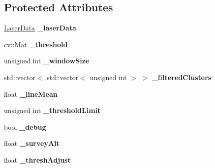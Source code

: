 \subsection*{Protected Attributes}
\begin{DoxyCompactItemize}
\item 
\hyperlink{classLaserData}{Laser\+Data} {\bfseries \+\_\+laser\+Data}\hypertarget{classLaserLoadImage_a20ccad5730f328187aa2ea6ebbd4593a}{}\label{classLaserLoadImage_a20ccad5730f328187aa2ea6ebbd4593a}

\item 
cv\+::\+Mat {\bfseries \+\_\+threshold}\hypertarget{classLaserLoadImage_aeb5996250313d036392ff988d1e84d8d}{}\label{classLaserLoadImage_aeb5996250313d036392ff988d1e84d8d}

\item 
unsigned int {\bfseries \+\_\+window\+Size}\hypertarget{classLaserLoadImage_ac0e8f5931a32a78468afcf1a15425d44}{}\label{classLaserLoadImage_ac0e8f5931a32a78468afcf1a15425d44}

\item 
std\+::vector$<$ std\+::vector$<$ unsigned int $>$ $>$ {\bfseries \+\_\+filtered\+Clusters}\hypertarget{classLaserLoadImage_af3fca1d9756d7cf5d304d5b813ff1b45}{}\label{classLaserLoadImage_af3fca1d9756d7cf5d304d5b813ff1b45}

\item 
float {\bfseries \+\_\+line\+Mean}\hypertarget{classLaserLoadImage_a90ff3111ee60ba50a9dcaf90b9a2734a}{}\label{classLaserLoadImage_a90ff3111ee60ba50a9dcaf90b9a2734a}

\item 
unsigned int {\bfseries \+\_\+threshold\+Limit}\hypertarget{classLaserLoadImage_a1d24ebe33a3d2ea1b9f2aa9c7e42caf4}{}\label{classLaserLoadImage_a1d24ebe33a3d2ea1b9f2aa9c7e42caf4}

\item 
bool {\bfseries \+\_\+debug}\hypertarget{classLaserLoadImage_a2c9ccd7fba113ebb52c6e5824d05daeb}{}\label{classLaserLoadImage_a2c9ccd7fba113ebb52c6e5824d05daeb}

\item 
float {\bfseries \+\_\+survey\+Alt}\hypertarget{classLaserLoadImage_a33091b991b7a53293f9d4a766583cdc7}{}\label{classLaserLoadImage_a33091b991b7a53293f9d4a766583cdc7}

\item 
float {\bfseries \+\_\+thresh\+Adjust}\hypertarget{classLaserLoadImage_ab51fd66959c5f55b562fafecbc71998a}{}\label{classLaserLoadImage_ab51fd66959c5f55b562fafecbc71998a}

\end{DoxyCompactItemize}


